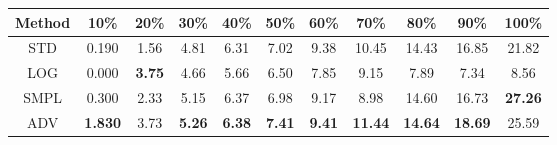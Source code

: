 \documentclass{standalone}
\begin{document}
\begin{tabular}{c|cccccccccc}
      \toprule
      Method & 10\% & 20\% & 30\% & 40\% & 50\% & 60\% & 70\% & 80\% & 90\% & 100\% \\
      \midrule
STD & 0.190 & 1.56 & 4.81 & 6.31 & 7.02 & 9.38 & 10.45 & 14.43 & 16.85 & 21.82\\
LOG & 0.000 & \textbf{3.75} & 4.66 & 5.66 & 6.50 & 7.85 & 9.15 & 7.89 & 7.34 & 8.56\\
SMPL & 0.300 & 2.33 & 5.15 & 6.37 & 6.98 & 9.17 & 8.98 & 14.60 & 16.73 & \textbf{27.26}\\
ADV & \textbf{1.830} & 3.73 & \textbf{5.26} & \textbf{6.38} & \textbf{7.41} & \textbf{9.41} & \textbf{11.44} & \textbf{14.64} & \textbf{18.69} & 25.59\\
  \bottomrule
\end{tabular}
\end{document}

